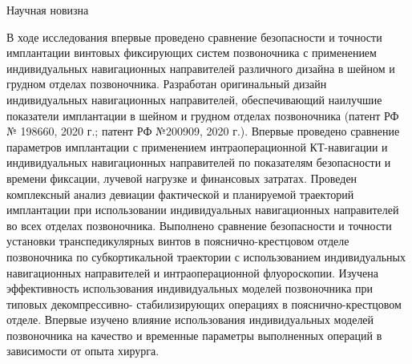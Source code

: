 
Научная новизна

В ходе исследования впервые проведено сравнение безопасности и
точности   имплантации    винтовых    фиксирующих        систем    позвоночника    с
применением индивидуальных навигационных направителей различного дизайна
в шейном и грудном отделах позвоночника. Разработан оригинальный дизайн
индивидуальных навигационных направителей, обеспечивающий наилучшие
показатели имплантации в шейном и грудном отделах позвоночника (патент РФ
№ 198660, 2020 г.; патент РФ №200909, 2020 г.).
      Впервые проведено сравнение параметров имплантации с применением
интраоперационной     КТ-навигации        и       индивидуальных      навигационных
направителей по показателям безопасности и времени фиксации, лучевой
нагрузке и финансовых затратах. Проведен комплексный анализ девиации
фактической и планируемой траекторий имплантации при использовании
индивидуальных навигационных направителей во всех отделах позвоночника.
Выполнено сравнение безопасности и точности установки транспедикулярных
винтов в пояснично-крестцовом отделе позвоночника по субкортикальной
траектории с использованием индивидуальных навигационных направителей и
интраоперационной    флуороскопии.    Изучена        эффективность     использования
индивидуальных     моделей   позвоночника         при   типовых      декомпрессивно-
стабилизирующих операциях в пояснично-крестцовом отделе.
      Впервые изучено влияние использования индивидуальных моделей
позвоночника на качество и временные параметры выполненных операций в
зависимости от опыта хирурга.
